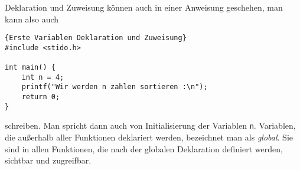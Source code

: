 Deklaration und Zuweisung können auch in einer Anweisung geschehen, man kann also auch
\begin{lstlisting}{Erste Variablen Deklaration und Zuweisung}
#include <stido.h>

int main() {
    int n = 4;
    printf("Wir werden n zahlen sortieren :\n");
    return 0;
}
\end{lstlisting}
schreiben. 
Man spricht dann auch von Initialisierung der Variablen \texttt{n}.
Variablen, die außerhalb aller Funktionen deklariert werden, bezeichnet man als \emph{global}.
Sie sind in allen Funktionen, die nach der globalen Deklaration definiert werden, sichtbar und zugreifbar.

%
